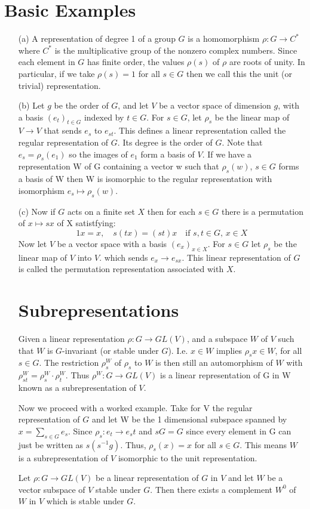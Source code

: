 \documentclass[12pt]{article}
\begin{document}
\section{Basic Examples}
\begin{enumerate}
    \item[(a)] A representation of degree 1 of a group $G$ is a homomorphism $\rho: G \to C^{*}$
    where $C^{*}$ is the multiplicative group of the nonzero complex numbers. Since each element in $G$
    has finite order, the values $\rho(s)$ of $\rho$ are roots of unity. In particular, if we take $\rho(s) = 1$
    for all $s \in G$ then we call this the unit (or trivial) representation.
    \item[(b)] Let $g$ be the order of $G$, and let $V$ be a vector space of dimension $g$,
    with a basis $(e_t)_{t \in G}$ indexed by $t \in G$. For $s \in G$, let $\rho_s$ be the
    linear map of $V \to V$ that sends $e_s$ to $e_{st}$. This defines a linear representation
    called the regular representation of $G$. Its degree is the order of $G$. Note that $e_s = \rho_s(e_1)$
    so the images of $e_1$ form a basis of $V$. If we have a representation W of G containing
    a vector w such that $\rho_s(w)$, $s \in G$ forms a basis of W then W is isomorphic to the
    regular representation with isomorphism $e_s \mapsto \rho_s(w)$.
    \item[(c)] Now if $G$ acts on a finite set $X$ then for each $s \in G$ there is a permutation
    of $x \mapsto sx$ of X satistfying:
    \[1x = x, \quad s(tx) = (st)x \quad \text{if } s, t \in G, \, x \in X \]
    Now let $V$ be a vector space with a basis $(e_x)_{x \in X}$. For $s \in G$
    let $\rho_s$ be the linear map of $V$ into $V$. which sends $e_x \to e_{sx}$.
    This linear representation of $G$ is called the permutation representation associated
    with $X$.

\section{Subrepresentations}
Given a linear representation $\rho: G \to GL(V)$, and a subspace $W$ of $V$ such
that $W$ is $G$-invariant (or stable under $G$). I.e. $x \in W$ implies $\rho_sx \in W$, for all $s \in G$.
The restriction $\rho_s^W$ of $\rho_s$ to $W$ is then still an automorphism of $W$ with
$\rho_{st}^W = \rho_s^W\cdot\rho_t^W$. Thus $\rho^W: G \to GL(V)$ is a linear representation of G in W 
known as a subrepresentation of $V$.

Now we proceed with a worked example. Take for V the regular representation of $G$ and let
W be the 1 dimensional subspace spanned by $x = \sum_{s \in G}e_s$. Since $\rho_s: e_t \to e_st$
and $sG = G$ since every element in G can just be written as $s(s^{-1}g)$. Thus, $\rho_s(x) = x$
for all $s \in G$. This means $W$ is a subrepresentation of $V$ isomorphic to the unit representation.

\begin{theorem}
    Let $\rho: G \to GL(V)$ be a linear representation of $G$ in $V$ and let $W$
    be a vector subspace of $V$ stable under $G$. Then there exists a complement $W^{0}$
    of $W$ in $V$ which is stable under $G$.
\end{theorem}

\end{enumerate}
\end{document}
